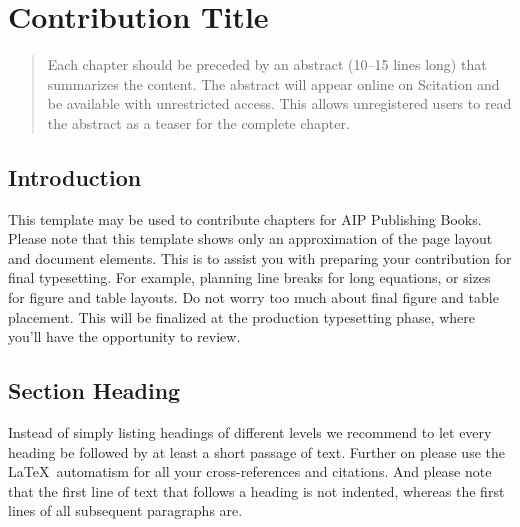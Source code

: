 \documentclass{aip-book}
\theoremstyle{definition}
\begin{document}
\chapter{Contribution Title} %


\begin{abstract}
Each chapter should be preceded by an abstract (10–15 lines long) that summarizes the content. 
The abstract will appear online on Scitation and be available with unrestricted access. 
This allows unregistered users to read the abstract as a teaser for the complete chapter. 
\end{abstract}


\section{Introduction}

This template may be used to contribute chapters for AIP Publishing Books. 
Please note that this template shows only an approximation of the page layout and document elements.
This is to assist you with preparing your contribution for final typesetting.
For example, planning line breaks for long equations, or sizes for figure and table layouts.
Do not worry too much about final figure and table placement.
This will be finalized at the production typesetting phase, where you'll have the opportunity to review.

\section{Section Heading}\label{sec:xref}

Instead of simply listing headings of different levels we recommend to let every heading be followed by at least a short passage of text. 
Further on please use the \LaTeX\ automatism for all your cross-references and citations. 
And please note that the first line of text that follows a heading is not indented, whereas the first lines of all subsequent paragraphs are.
\end{document}
